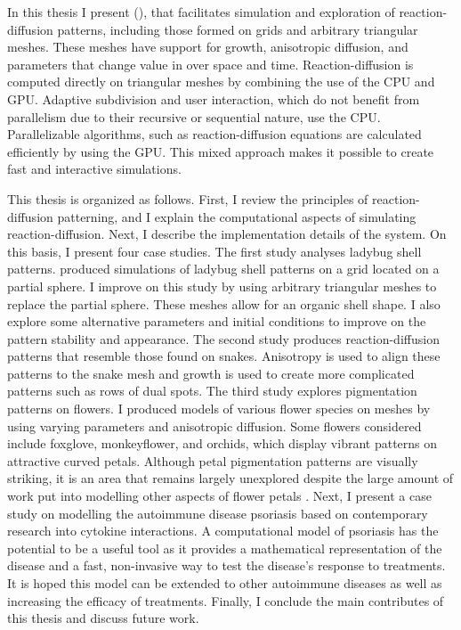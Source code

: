 In this thesis I present  (\ProgramName{}), that facilitates simulation and exploration of reaction-diffusion patterns, including those formed on grids and arbitrary triangular meshes. These meshes have support for growth, anisotropic diffusion, and parameters that change value in over space and time. Reaction-diffusion is computed directly on triangular meshes by combining the use of the CPU and GPU. Adaptive subdivision and user interaction, which do not benefit from parallelism due to their recursive or sequential nature, use the CPU. Parallelizable algorithms, such as reaction-diffusion equations are calculated efficiently by using the GPU. This mixed approach makes it possible to create fast and interactive simulations. 

This thesis is organized as follows. First, I review the principles of reaction-diffusion patterning, and I explain the computational aspects of simulating reaction-diffusion. Next, I describe the implementation details of the \ProgramName{} system. On this basis, I present four case studies. The first study analyses ladybug shell patterns. \citet{liaw2001} produced simulations of ladybug shell patterns on a grid located on a partial sphere. I improve on this study by using arbitrary triangular meshes to replace the partial sphere. These meshes allow for an organic shell shape. I also explore some alternative parameters and initial conditions to improve on the pattern stability and appearance. The second study produces reaction-diffusion patterns that resemble those found on snakes. Anisotropy is used to align these patterns to the snake mesh and growth is used to create more complicated patterns such as rows of dual spots. The third study explores pigmentation patterns on flowers. I produced models of various flower species on meshes by using varying parameters and anisotropic diffusion. Some flowers considered include foxglove, monkeyflower, and orchids, which display vibrant patterns on attractive curved petals. Although petal pigmentation patterns are visually striking, it is an area that remains largely unexplored despite the large amount of work put into modelling other aspects of flower petals \citep{owens2016}. Next, I present a case study on modelling the autoimmune disease psoriasis based on contemporary research into cytokine interactions. A computational model of psoriasis has the potential to be a useful tool as it provides a mathematical representation of the disease and a fast, non-invasive way to test the disease's response to treatments. It is hoped this model can be extended to other autoimmune diseases as well as increasing the efficacy of treatments. Finally, I conclude the main contributes of this thesis and discuss future work.